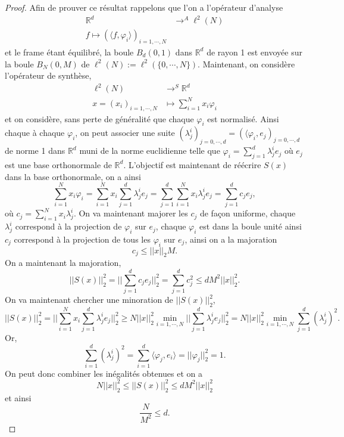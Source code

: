 \begin{proof}
	Afin de prouver ce résultat rappelons que l'on a l'opérateur d'analyse
	\begin{align}
		\mathbb{R}^d &\longrightarrow^A \ell^2(N)\\
		f \longmapsto (\langle f, \varphi_i \rangle)_{i=1,\cdots, N}
	\end{align}
	et le frame étant équilibré, la boule $B_d(0,1)$ dans $\mathbb{R}^d$ de rayon 1 est envoyée sur la boule $B_N(0,M)$ de $\ell^2(N) := \ell^2(\{0, \cdots, N\})$.
	Maintenant, on considère l'opérateur de synthèse,
	\begin{align}
		\ell^2(N) &\longrightarrow^S \mathbb{R}^d\\
		x=(x_i)_{i=1, \cdots, N} &\longmapsto \sum_{i=1}^N x_i \varphi_i
	\end{align}
	et on considère, sans perte de généralité que chaque $\varphi_i$ est normalisé. Ainsi chaque à chaque $\varphi_i$, on peut associer une suite $(\lambda_j^i)_{j=0, \cdots, d}=(\langle \varphi_i, e_j)_{j=0,\cdots, d}$ de norme 1 dans $\mathbb{R}^d$ muni de la norme euclidienne telle que $\varphi_i = \sum_{j=1}^d \lambda_j^i e_j$ où $e_j$ est une base orthonormale de $\mathbb{R}^d$. 
	L'objectif est maintenant de réécrire $S(x)$ dans la base orthonormale, on a ainsi
	\begin{equation}
		\sum_{i=1}^N x_i \varphi_i = \sum_{i=1}^N x_i \sum_{j=1}^d \lambda_j^i e_j = \sum_{j=1}^d \sum_{i=1}^N x_i \lambda_j^ie_j =\sum_{j=1}^d c_j e_j,
	\end{equation}
	où $c_j = \sum_{i=1}^Nx_i\lambda_j^i$. On va maintenant majorer les $c_j$ de façon uniforme, chaque $\lambda_j^i$ correspond à la projection de $\varphi_i$ sur $e_j$, chaque $\varphi_i$ est dans la boule unité ainsi $c_j$ correspond à la projection de tous les $\varphi_i$ sur $e_j$, ainsi on a la majoration
	\begin{equation}
		c_j \leq ||x||_2 M.
	\end{equation}
	On a maintenant la majoration,
	\begin{equation}
		||S (x)||^2_2 = ||\sum_{j=1}^d c_j e_j||_2^2= \sum_{j=1}^d c_j^2 \leq d M^2||x||_2^2. 
	\end{equation}
	On va maintenant chercher une minoration de $||S(x)||_2^2$,
	\begin{equation}
		||S(x)||_2^2 = ||\sum_{i=1}^N x_i \sum_{j=1}^d \lambda_j^i e_j||_2^2 \geq N||x||_2^2 \min_{i=1, \cdots, N} ||\sum_{j=1}^d \lambda_j^i e_j||_2^2 = N||x||_2^2 \min_{i=1, \cdots, N}\sum_{j=1}^d (\lambda_j^i)^2.
	\end{equation}
	Or,
	\begin{equation}
		\sum_{i=1}^d (\lambda_j^i)^2 = \sum_{i=1}^d \langle \varphi_j, e_i \rangle =||\varphi_j||_2^2=1.  
	\end{equation}
	On peut donc combiner les inégalités obtenues et on a
	\begin{equation}
		N ||x||_2^2 \leq ||S(x)||_2^2 \leq d M^2||x||_2^2
	\end{equation}
	et ainsi
	\begin{equation}
		\frac{N}{M^2} \leq d.
	\end{equation}
\end{proof}

